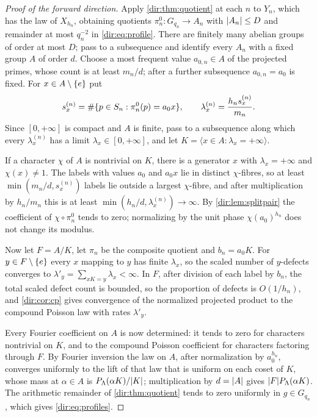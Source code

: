 \begin{proof}[Proof of the forward direction]
Apply \cref{dir:thm:quotient} at each $n$ to $Y_n$, which has the law of $X_{h_n}$, obtaining quotients
$\pi_n^0\colon G_{q_n}\to A_n$ with $\lvert A_n\rvert\le D$ and remainder at most $q_n^{-2}$ in
\eqref{dir:eq:profile}. There are finitely many abelian groups of order at most $D$;
pass to a subsequence and identify every $A_n$ with a fixed group $A$ of order $d$. Choose a most frequent
value $a_{0,n}\in A$ of the projected primes, whose count is at least $m_n/d$; after a further subsequence
$a_{0,n}=a_0$ is fixed. For $x\in A\setminus\{e\}$ put
\[
 s_x^{(n)}=\#\{p\in S_n:\pi_n^0(p)=a_0x\},\qquad\lambda_x^{(n)}=\frac{h_ns_x^{(n)}}{m_n}.
\]
Since $[0,+\infty]$ is compact and $A$ is finite, pass to a subsequence along which every $\lambda_x^{(n)}$
has a limit $\lambda_x\in[0,+\infty]$, and let $K=\langle x\in A:\lambda_x=+\infty\rangle$.

If a character $\chi$ of $A$ is nontrivial on $K$, there is a generator $x$ with $\lambda_x=+\infty$ and
$\chi(x)\ne1$. The labels with values $a_0$ and $a_0x$ lie in distinct $\chi$-fibres, so at least
$\min(m_n/d,s_x^{(n)})$ labels lie outside a largest $\chi$-fibre, and after multiplication by $h_n/m_n$
this is at least $\min(h_n/d,\lambda_x^{(n)})\to\infty$. By \cref{dir:lem:splitpair} the coefficient of
$\chi\circ\pi_n^0$ tends to zero; normalizing by the unit phase $\chi(a_0)^{h_n}$ does not change its
modulus.

Now let $F=A/K$, let $\pi_n$ be the composite quotient and $b_n=a_0K$. For $y\in F\setminus\{e\}$ every
$x$ mapping to $y$ has finite $\lambda_x$, so the scaled number of $y$-defects converges to
$\lambda'_y=\sum_{xK=y}\lambda_x<\infty$. In $F$, after division of each label by $b_n$, the total scaled
defect count is bounded, so the proportion of defects is $O(1/h_n)$, and \cref{dir:cor:cp} gives
convergence of the normalized projected product to the compound Poisson law with rates $\lambda'_y$.

Every Fourier coefficient on $A$ is now determined: it tends to zero for characters nontrivial on $K$, and
to the compound Poisson coefficient for characters factoring through $F$. By Fourier inversion the law on
$A$, after normalization by $a_0^{h_n}$, converges uniformly to the lift of that law that is uniform on each
coset of $K$, whose mass at $\alpha\in A$ is $P_\Lambda(\alpha K)/\lvert K\rvert$; multiplication by $d=\lvert A\rvert$
gives $\lvert F\rvert P_\Lambda(\alpha K)$. The arithmetic remainder of \cref{dir:thm:quotient} tends to zero
uniformly in $g\in G_{q_n}$, which gives \eqref{dir:eq:profiles}.
\end{proof}

